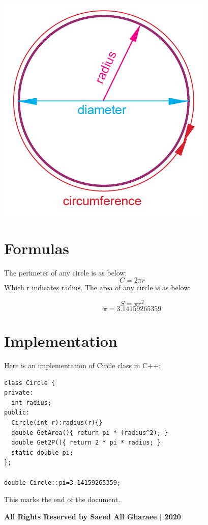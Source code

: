 \documentclass[12pt]{article}
\begin{document}
\begin{center}
  \includegraphics[scale=1]{circle.png}
\end{center}
\newpage
\section{Formulas}
The perimeter of any circle is as below:
{\Large\[C = 2\pi r\]}
Which r indicates radius. The area of any circle is as below:


{\Large\[S = \pi r^2\]}
{\Large\[\pi = 3.14159265359\]}

\section{Implementation }
Here is an implementation of Circle class in C++:





\begin{lstlisting}
class Circle {
private:
  int radius;
public:
  Circle(int r):radius(r){}
  double GetArea(){ return pi * (radius^2); }
  double Get2P(){ return 2 * pi * radius; }
  static double pi;
};

double Circle::pi=3.14159265359; 
\end{lstlisting}

\begin{center}

This marks the end of the document.

\color{blue}
  \textbf{{\large All Rights Reserved by Saeed All Gharaee | 2020 }} 
\end{center}
\end{document}
